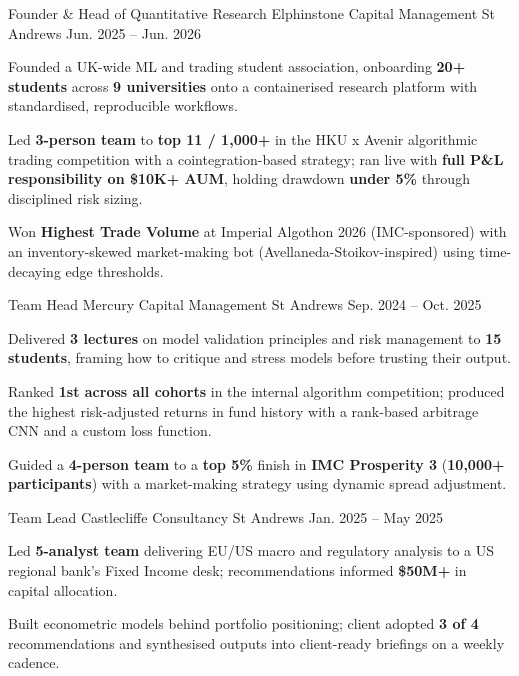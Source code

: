 \begin{cventries}
  \cventry
    {Founder \& Head of Quantitative Research} %
    {Elphinstone Capital Management} %
    {St Andrews} %
    {Jun. 2025 -- Jun. 2026} %
    {
      \begin{cvitems}
        \item {Founded a UK-wide ML and trading student association, onboarding \textbf{20+ students} across \textbf{9 universities} onto a containerised research platform with standardised, reproducible workflows.}
        \item {Led \textbf{3-person team} to \textbf{top 11 / 1,000+} in the HKU x Avenir algorithmic trading competition with a cointegration-based strategy; ran live with \textbf{full P\&L responsibility on \$10K+ AUM}, holding drawdown \textbf{under 5\%} through disciplined risk sizing.}
        \item {Won \textbf{Highest Trade Volume} at Imperial Algothon 2026 (IMC-sponsored) with an inventory-skewed market-making bot (Avellaneda-Stoikov-inspired) using time-decaying edge thresholds.}
      \end{cvitems}
    }

  \cventry
    {Team Head} %
    {Mercury Capital Management} %
    {St Andrews} %
    {Sep. 2024 -- Oct. 2025} %
    {
      \begin{cvitems}
        \item {Delivered \textbf{3 lectures} on model validation principles and risk management to \textbf{15 students}, framing how to critique and stress models before trusting their output.}
        \item {Ranked \textbf{1st across all cohorts} in the internal algorithm competition; produced the highest risk-adjusted returns in fund history with a rank-based arbitrage CNN and a custom loss function.}
        \item {Guided a \textbf{4-person team} to a \textbf{top 5\%} finish in \textbf{IMC Prosperity 3} (\textbf{10,000+ participants}) with a market-making strategy using dynamic spread adjustment.}
      \end{cvitems}
    }

  \cventry
    {Team Lead} %
    {Castlecliffe Consultancy} %
    {St Andrews} %
    {Jan. 2025 -- May 2025} %
    {
      \begin{cvitems}
        \item {Led \textbf{5-analyst team} delivering EU/US macro and regulatory analysis to a US regional bank's Fixed Income desk; recommendations informed \textbf{\$50M+} in capital allocation.}
        \item {Built econometric models behind portfolio positioning; client adopted \textbf{3 of 4} recommendations and synthesised outputs into client-ready briefings on a weekly cadence.}
      \end{cvitems}
    }


\end{cventries}

